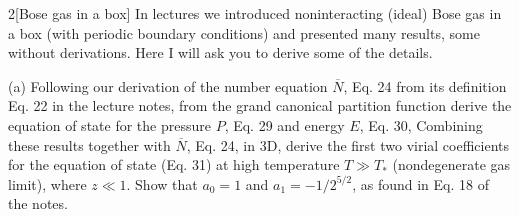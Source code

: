 \documentclass[12pt]{article}
\begin{document}
\begin{problem}{2}[Bose gas in a box]
In lectures we introduced noninteracting (ideal) Bose gas in a box (with
periodic boundary conditions) and presented many results, some without
derivations. Here I will ask you to derive some of the details.

(a) Following our derivation of the number equation $\overline{N}$, Eq. 24 from
its definition Eq. 22 in the lecture notes, from the grand canonical partition
function derive the equation of state for the pressure $P$, Eq. 29 and energy
$E$, Eq. 30, Combining these results together with $\overline{N}$, Eq. 24, in
3D, derive the first two virial coefficients for the equation of state (Eq. 31)
at high temperature $T\gg T_\ast$ (nondegenerate gas limit), where $z\ll 1$.
Show that $a_0=1$ and $a_1=-1/2^{5/2}$, as found in Eq. 18 of the notes.


\end{problem}
\end{document}
